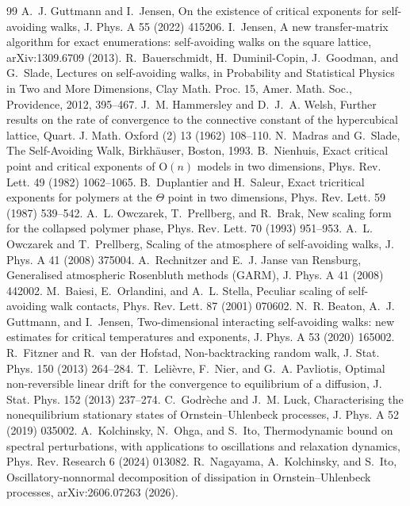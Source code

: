 \documentclass[11pt]{article}
\theoremstyle{definition}
\begin{document}
\begin{thebibliography}{99}
 A.~J. Guttmann and I.~Jensen, On the existence of critical exponents for self-avoiding walks, J. Phys. A 55 (2022) 415206.
 I.~Jensen, A new transfer-matrix algorithm for exact enumerations: self-avoiding walks on the square lattice, arXiv:1309.6709 (2013).
 R.~Bauerschmidt, H.~Duminil-Copin, J.~Goodman, and G.~Slade, Lectures on self-avoiding walks, in Probability and Statistical Physics in Two and More Dimensions, Clay Math. Proc. 15, Amer. Math. Soc., Providence, 2012, 395--467.
 J.~M. Hammersley and D.~J.~A. Welsh, Further results on the rate of convergence to the connective constant of the hypercubical lattice, Quart. J. Math. Oxford (2) 13 (1962) 108--110.
 N.~Madras and G.~Slade, The Self-Avoiding Walk, Birkh\"auser, Boston, 1993.
 B.~Nienhuis, Exact critical point and critical exponents of $\mathrm O(n)$ models in two dimensions, Phys. Rev. Lett. 49 (1982) 1062--1065.
 B.~Duplantier and H.~Saleur, Exact tricritical exponents for polymers at the $\Theta$ point in two dimensions, Phys. Rev. Lett. 59 (1987) 539--542.
 A.~L. Owczarek, T.~Prellberg, and R.~Brak, New scaling form for the collapsed polymer phase, Phys. Rev. Lett. 70 (1993) 951--953.
 A.~L. Owczarek and T.~Prellberg, Scaling of the atmosphere of self-avoiding walks, J. Phys. A 41 (2008) 375004.
 A.~Rechnitzer and E.~J. Janse van Rensburg, Generalised atmospheric Rosenbluth methods (GARM), J. Phys. A 41 (2008) 442002.
 M.~Baiesi, E.~Orlandini, and A.~L. Stella, Peculiar scaling of self-avoiding walk contacts, Phys. Rev. Lett. 87 (2001) 070602.
 N.~R. Beaton, A.~J. Guttmann, and I.~Jensen, Two-dimensional interacting self-avoiding walks: new estimates for critical temperatures and exponents, J. Phys. A 53 (2020) 165002.
 R.~Fitzner and R.~van der Hofstad, Non-backtracking random walk, J. Stat. Phys. 150 (2013) 264--284.
 T.~Leli\`evre, F.~Nier, and G.~A. Pavliotis, Optimal non-reversible linear drift for the convergence to equilibrium of a diffusion, J. Stat. Phys. 152 (2013) 237--274.
 C.~Godr\`eche and J.~M. Luck, Characterising the nonequilibrium stationary states of Ornstein--Uhlenbeck processes, J. Phys. A 52 (2019) 035002.
 A.~Kolchinsky, N.~Ohga, and S.~Ito, Thermodynamic bound on spectral perturbations, with applications to oscillations and relaxation dynamics, Phys. Rev. Research 6 (2024) 013082.
 R.~Nagayama, A.~Kolchinsky, and S.~Ito, Oscillatory-nonnormal decomposition of dissipation in Ornstein--Uhlenbeck processes, arXiv:2606.07263 (2026).

\end{thebibliography}
\end{document}
